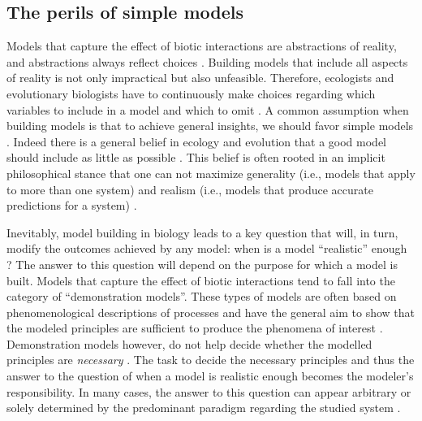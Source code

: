 \documentclass[12pt]{article}
\begin{document}


\subsection*{The perils of simple models}
Models that capture the effect of biotic interactions are abstractions of reality, and abstractions always reflect choices \citep{levins2006strategies}. Building models that include all aspects of reality is not only impractical but also unfeasible.  Therefore, ecologists and evolutionary biologists have to continuously make choices regarding which variables to include in a model and which to omit \citep{evans2012predictive, rossberg2019let}. A common assumption when building models is that to achieve general insights, we should favor simple models \citep{evans2013simple}. Indeed there is a general belief in ecology and evolution that a good model should include as little as possible \citep{evans2013simple,orzack2012philosophy}. This belief is often rooted in an implicit philosophical stance that one can not maximize generality (i.e., models that apply to more than one system) and realism (i.e., models that produce accurate predictions for a system) \citep{levins2006strategies,evans2012predictive}.


Inevitably, model building in biology leads to a key question that will, in turn, modify the outcomes achieved by any model: when is a model ``realistic'' enough \citep{stouffer2019all}? The answer to this question will depend on the purpose for which a model is built. Models that capture the effect of biotic interactions tend to fall into the category of ``demonstration models''. These types of models are often based on phenomenological descriptions of processes and have the general aim to show that the modeled principles are sufficient to produce the phenomena of interest \citep{evans2013simple}.  Demonstration models however, do not help decide whether the modelled principles are \textit{necessary} \citep{evans2013simple}. The task to decide the necessary principles and thus the answer to the question of when a model is realistic enough becomes the modeler's responsibility. In many cases, the answer to this question can appear arbitrary or solely determined by the predominant paradigm regarding the studied system \citep{holland2006comment,bascompte2006response,kokko2007ecogenetic,aladwani2019addition,mayfield2017higher,martyn2021identifying}.
\end{document}
